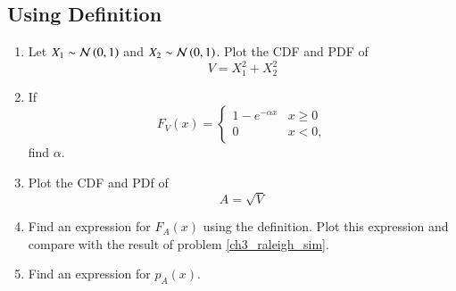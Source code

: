 \renewcommand{\theequation}{\theenumi}
\renewcommand{\thefigure}{\theenumi}

\subsection{Using Definition}
\begin{enumerate}[label=\thesubsection.\arabic*.,ref=\thesubsection.\theenumi]

%
\item
Let $X_1 \sim  \mathcal{N}\left(0,1\right)$ and $X_2 \sim  \mathcal{N}\left(0,1\right)$. Plot the CDF and PDF of
%
\begin{equation}
V = X_1^2 + X_2^2
\end{equation}
%

%
%
\item
If
%
\begin{equation}
F_{V}(x) = 
\begin{cases}
1 - e^{-\alpha x} & x \geq 0 \\
0 & x < 0,
\end{cases}
\end{equation}
%
find $\alpha$.

%
\item
\label{ch3_raleigh_sim}
Plot the CDF and PDf of
%
\begin{equation}
A = \sqrt{V}
\end{equation}
%

%
\item
Find an expression for $F_{A}(x)$ using the definition. Plot this expression and compare with the result of problem \ref{ch3_raleigh_sim}. 

%
\item
Find an expression for $p_{A}(x)$.
\end{enumerate}

%
